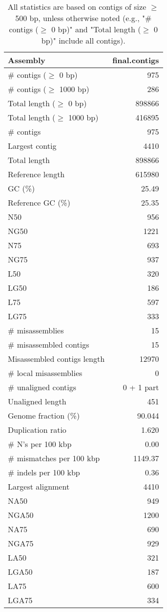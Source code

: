 \documentclass[12pt,a4paper]{article}
\begin{document}
\begin{table}[ht]
\begin{center}
\caption{All statistics are based on contigs of size $\geq$ 500 bp, unless otherwise noted (e.g., "\# contigs ($\geq$ 0 bp)" and "Total length ($\geq$ 0 bp)" include all contigs).}
\begin{tabular}{|l*{1}{|r}|}
\hline
Assembly & final.contigs \\ \hline
\# contigs ($\geq$ 0 bp) & 975 \\ \hline
\# contigs ($\geq$ 1000 bp) & 286 \\ \hline
Total length ($\geq$ 0 bp) & 898866 \\ \hline
Total length ($\geq$ 1000 bp) & 416895 \\ \hline
\# contigs & 975 \\ \hline
Largest contig & 4410 \\ \hline
Total length & 898866 \\ \hline
Reference length & 615980 \\ \hline
GC (\%) & 25.49 \\ \hline
Reference GC (\%) & 25.35 \\ \hline
N50 & 956 \\ \hline
NG50 & 1221 \\ \hline
N75 & 693 \\ \hline
NG75 & 937 \\ \hline
L50 & 320 \\ \hline
LG50 & 186 \\ \hline
L75 & 597 \\ \hline
LG75 & 333 \\ \hline
\# misassemblies & 15 \\ \hline
\# misassembled contigs & 15 \\ \hline
Misassembled contigs length & 12970 \\ \hline
\# local misassemblies & 0 \\ \hline
\# unaligned contigs & 0 + 1 part \\ \hline
Unaligned length & 451 \\ \hline
Genome fraction (\%) & 90.044 \\ \hline
Duplication ratio & 1.620 \\ \hline
\# N's per 100 kbp & 0.00 \\ \hline
\# mismatches per 100 kbp & 1149.37 \\ \hline
\# indels per 100 kbp & 0.36 \\ \hline
Largest alignment & 4410 \\ \hline
NA50 & 949 \\ \hline
NGA50 & 1200 \\ \hline
NA75 & 690 \\ \hline
NGA75 & 929 \\ \hline
LA50 & 321 \\ \hline
LGA50 & 187 \\ \hline
LA75 & 600 \\ \hline
LGA75 & 334 \\ \hline
\end{tabular}
\end{center}
\end{table}
\end{document}
